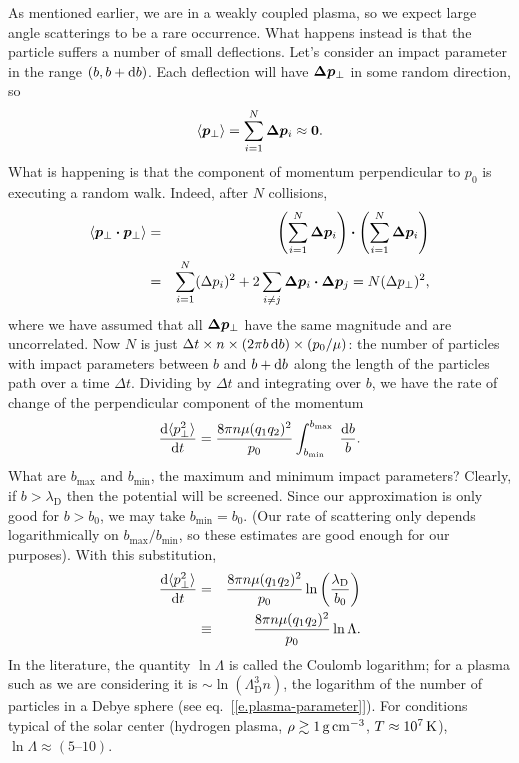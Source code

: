 As mentioned earlier, we are in a weakly coupled plasma, so we expect large angle scatterings to be a rare occurrence. What happens instead is that the particle suffers a number of small deflections. Let's consider an impact parameter in the range $(b,b+\mathrm{d} b)$. Each deflection will have $\boldsymbol{\Delta p}_{\bot}$ in some random direction, so
\[ \langle \boldsymbol{ p}_{\bot}\rangle = \sum_{i=1}^{N} \boldsymbol{\Delta p}_{i} \approx \boldsymbol{0}. \]
What is happening is that the component of momentum perpendicular to $p_{0}$ is executing a random walk.  Indeed, after $N$ collisions,
\begin{eqnarray*} \langle \boldsymbol{p}_{\bot} \boldsymbol{\cdot} \boldsymbol{p}_{\bot} \rangle  &=& \left( \sum_{i=1}^{N} \boldsymbol{\Delta p}_{i}\right)\boldsymbol{\cdot} \left( \sum_{i=1}^{N} \boldsymbol{\Delta p}_{i} \right) \\
&=& \sum_{i=1}^{N} (\Delta p_{i})^{2} + 2\sum_{i\ne j} \boldsymbol{\Delta p}_{i}\boldsymbol{\cdot}\boldsymbol{\Delta p}_{j} = N(\Delta p_{\bot})^{2},
\end{eqnarray*}
where we have assumed that all $\boldsymbol{\Delta p}_{\perp}$ have the same magnitude and are uncorrelated. Now $N$ is just $\Delta t \times n \times (2\pi b \,\mathrm{d} b) \times (p_{0}/\mu)$: the number of particles with impact parameters between $b$ and $b+\mathrm{d} b$ along the length of the particles path over a time $\Delta t$.  Dividing by $\Delta t$ and integrating over $b$, we have the rate of change of the perpendicular component of the momentum
\begin{equation}\label{e.msdev-momentum}
\frac{\mathrm{d} \langle p_{\bot}^{2}\rangle }{\mathrm{d} t} = \frac{8\pi n\mu (q_{1}q_{2})^{2}}{p_{0}}\int_{b_{\mathrm{min}}}^{b_{\mathrm{max}}}\;\frac{\mathrm{d} b}{b}.
\end{equation}
What are $b_{\mathrm{max}}$ and $b_{\mathrm{min}}$, the maximum and minimum impact parameters? Clearly, if $b > \lambda_{\mathrm{D}}$ then the potential will be screened.  Since our approximation is only good for $b > b_{0}$, we may take $b_{\mathrm{min}} = b_{0}$. (Our rate of scattering only depends logarithmically on $b_{\mathrm{max}}/b_{\mathrm{min}}$, so these estimates are good enough for our purposes).  With this substitution,
\begin{eqnarray}
\frac{\mathrm{d} \langle p_{\bot}^{2}\rangle }{\mathrm{d} t} &=& \frac{8\pi n\mu (q_{1}q_{2})^{2}}{p_{0}}\ln\left(\frac{\lambda_{\mathrm{D}}}{b_{0}}\right)\nonumber \\
 &\equiv& \frac{8\pi n\mu (q_{1}q_{2})^{2}}{p_{0}}\ln\Lambda.
\label{e.deflection-rate}
\end{eqnarray}
In the literature, the quantity $\ln\Lambda$ is called the Coulomb logarithm; for a plasma such as we are considering it is $\sim \ln  \left(\Lambda_{\mathrm{D}}^{3} n\right)$, the logarithm of the number of particles in a Debye sphere (see eq.~[\ref{e.plasma-parameter}]).  For conditions typical of the solar center (hydrogen plasma, $\rho \gtrsim 1\,\mathrm{g}\,{\mathrm{c}\mathrm{m}}^{-3}$, $T \approx 10^{7}\,\mathrm{K}$), $\ln\Lambda \approx \left(5\textrm{--}10\right)$.  

